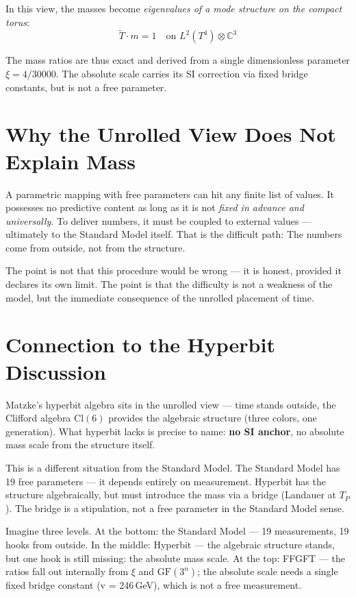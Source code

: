 In this view, the masses become \emph{eigenvalues of a
mode structure on the compact torus}:
\[
  \tilde{T} \cdot m = 1 \quad \text{on } L^2(T^4) \otimes \mathbb{C}^3
\]

The mass ratios are thus exact and derived from a single dimensionless
parameter $\xi = 4/30000$. The absolute scale carries its
SI correction via fixed bridge constants, but is not a free parameter.

\section{Why the Unrolled View Does Not Explain Mass}

A parametric mapping with free parameters can hit any finite
list of values. It possesses no predictive content as long as it is not
\emph{fixed in advance and universally}. To deliver numbers, it must be coupled to
external values --- ultimately to the Standard Model itself. That
is the difficult path: The numbers come from outside, not from the structure.

The point is not that this procedure would be wrong --- it is honest,
provided it declares its own limit. The point is that the difficulty
is not a weakness of the model, but the immediate consequence of the unrolled
placement of time.

\section{Connection to the Hyperbit Discussion}

Matzke's hyperbit algebra sits in the unrolled view --- time stands
outside, the Clifford algebra $\mathrm{Cl}(6)$ provides the algebraic
structure (three colors, one generation). What hyperbit lacks is precise
to name: \textbf{no SI anchor}, no absolute mass scale from the
structure itself. 

This is a different situation from the Standard Model. The Standard Model
has 19 free parameters --- it depends entirely on measurement. Hyperbit
has the structure algebraically, but must introduce the mass via a bridge
(Landauer at $T_P$). The bridge is a stipulation, not a
free parameter in the Standard Model sense.

\begin{laierspur}
Imagine three levels. At the bottom: the Standard Model --- 19 measurements,
19 hooks from outside. In the middle: Hyperbit --- the algebraic structure
stands, but one hook is still missing: the absolute mass scale.
At the top: FFGFT --- the ratios fall out internally from $\xi$ and
$\mathrm{GF}(3^n)$; the absolute scale needs a single fixed
bridge constant (v = 246\,GeV), which is not a free measurement. 
\end{laierspur}

